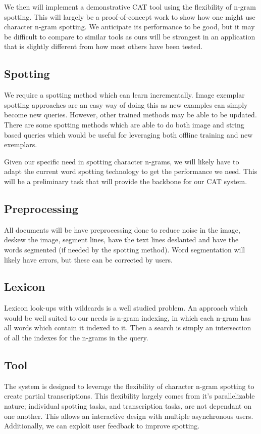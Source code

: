 \documentclass[ms]{byuprop}
\begin{document}
We then will implement a demonstrative CAT tool using the flexibility of n-gram spotting. This will largely be a proof-of-concept work to show how one might use character n-gram spotting. We anticipate its performance to be good, but it may be difficult to compare to similar tools as ours will be strongest in an application that is slightly different from how most others have been tested.


\subsection{Spotting}
We require a spotting method which can learn incrementally. Image exemplar spotting approaches are an easy way of doing this as new examples can simply become new queries. However, other trained methods may be able to be updated. There are some spotting methods which are able to do both image and string based queries\cite{Almazan2014} which would be useful for leveraging both offline training and new exemplars.

Given our specific need in spotting character n-grams, we will likely have to adapt the current word spotting technology to get the performance we need. This will be a preliminary task that will provide the backbone for our CAT system.

\subsection{Preprocessing}
All documents will be have preprocessing done to reduce noise in the image, deskew the image, segment lines, have the text lines deslanted and have the words segmented (if needed by the spotting method). Word segmentation will likely have errors, but these can be corrected by users.

\subsection{Lexicon}
Lexicon look-ups with wildcards is a well studied problem. An approach which would be well suited to our needs is n-gram indexing, in which each n-gram has all words which contain it indexed to it. Then a search is simply an intersection of all the indexes for the n-grams in the query.

\subsection{Tool}
The system is designed to leverage the flexibility of character n-gram spotting to create partial transcriptions. This flexibility largely comes from it's parallelizable nature; individual spotting tasks, and transcription tasks, are not dependant on one another. This allows an interactive design with multiple asynchronous users. Additionally, we can exploit user feedback to improve spotting.
\end{document}
